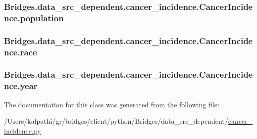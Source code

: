 \subsubsection[{population}]{\setlength{\rightskip}{0pt plus 5cm}Bridges.\+data\+\_\+src\+\_\+dependent.\+cancer\+\_\+incidence.\+Cancer\+Incidence.\+population}\label{class_bridges_1_1data__src__dependent_1_1cancer__incidence_1_1_cancer_incidence_a74c5ae678f059c32be173fde9d87ade2}
\hypertarget{class_bridges_1_1data__src__dependent_1_1cancer__incidence_1_1_cancer_incidence_a7d91ba9672c254875055c38192f731c1}{}
\subsubsection[{race}]{\setlength{\rightskip}{0pt plus 5cm}Bridges.\+data\+\_\+src\+\_\+dependent.\+cancer\+\_\+incidence.\+Cancer\+Incidence.\+race}\label{class_bridges_1_1data__src__dependent_1_1cancer__incidence_1_1_cancer_incidence_a7d91ba9672c254875055c38192f731c1}
\hypertarget{class_bridges_1_1data__src__dependent_1_1cancer__incidence_1_1_cancer_incidence_a343da9473bb9f259cd39a87f45af3e03}{}
\subsubsection[{year}]{\setlength{\rightskip}{0pt plus 5cm}Bridges.\+data\+\_\+src\+\_\+dependent.\+cancer\+\_\+incidence.\+Cancer\+Incidence.\+year}\label{class_bridges_1_1data__src__dependent_1_1cancer__incidence_1_1_cancer_incidence_a343da9473bb9f259cd39a87f45af3e03}


The documentation for this class was generated from the following file\+:\begin{DoxyCompactItemize}
\item 
/\+Users/kalpathi/gr/bridges/client/python/\+Bridges/data\+\_\+src\+\_\+dependent/\hyperlink{cancer__incidence_8py}{cancer\+\_\+incidence.\+py}\end{DoxyCompactItemize}
